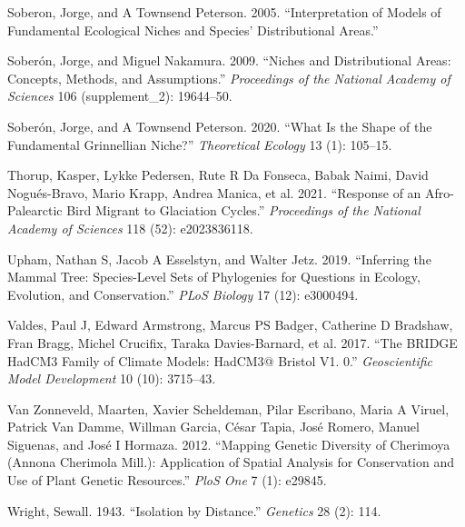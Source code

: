 \documentclass[
]{article}
\newlength{\cslhangindent}
\newlength{\cslentryspacingunit} %
\newenvironment{CSLReferences}[2] %
 {%
  \setlength{\parindent}{0pt}
  \ifodd #1
  \let\oldpar\par
  \def\par{\hangindent=\cslhangindent\oldpar}
  \fi
  \setlength{\parskip}{#2\cslentryspacingunit}
 }%
 {}
\begin{document}
\begin{CSLReferences}{1}{0}
\leavevmode{}%
Soberon, Jorge, and A Townsend Peterson. 2005. {``Interpretation of
Models of Fundamental Ecological Niches and Species' Distributional
Areas.''}

\leavevmode{}%
Soberón, Jorge, and Miguel Nakamura. 2009. {``Niches and Distributional
Areas: Concepts, Methods, and Assumptions.''} \emph{Proceedings of the
National Academy of Sciences} 106 (supplement\_2): 19644--50.

\leavevmode{}%
Soberón, Jorge, and A Townsend Peterson. 2020. {``What Is the Shape of
the Fundamental Grinnellian Niche?''} \emph{Theoretical Ecology} 13 (1):
105--15.

\leavevmode{}%
Thorup, Kasper, Lykke Pedersen, Rute R Da Fonseca, Babak Naimi, David
Nogués-Bravo, Mario Krapp, Andrea Manica, et al. 2021. {``Response of an
Afro-Palearctic Bird Migrant to Glaciation Cycles.''} \emph{Proceedings
of the National Academy of Sciences} 118 (52): e2023836118.

\leavevmode{}%
Upham, Nathan S, Jacob A Esselstyn, and Walter Jetz. 2019. {``Inferring
the Mammal Tree: Species-Level Sets of Phylogenies for Questions in
Ecology, Evolution, and Conservation.''} \emph{PLoS Biology} 17 (12):
e3000494.

\leavevmode{}%
Valdes, Paul J, Edward Armstrong, Marcus PS Badger, Catherine D
Bradshaw, Fran Bragg, Michel Crucifix, Taraka Davies-Barnard, et al.
2017. {``The BRIDGE HadCM3 Family of Climate Models: HadCM3@ Bristol V1.
0.''} \emph{Geoscientific Model Development} 10 (10): 3715--43.

\leavevmode{}%
Van Zonneveld, Maarten, Xavier Scheldeman, Pilar Escribano, Maria A
Viruel, Patrick Van Damme, Willman Garcia, César Tapia, José Romero,
Manuel Siguenas, and José I Hormaza. 2012. {``Mapping Genetic Diversity
of Cherimoya (Annona Cherimola Mill.): Application of Spatial Analysis
for Conservation and Use of Plant Genetic Resources.''} \emph{PloS One}
7 (1): e29845.

\leavevmode{}%
Wright, Sewall. 1943. {``Isolation by Distance.''} \emph{Genetics} 28
(2): 114.

\end{CSLReferences}
\end{document}
